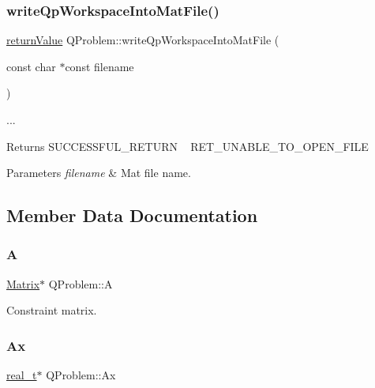 \subsubsection{\texorpdfstring{write\+Qp\+Workspace\+Into\+Mat\+File()}{writeQpWorkspaceIntoMatFile()}}
{\footnotesize\ttfamily \hyperlink{_message_handling_8hpp_a81d556f613bfbabd0b1f9488c0fa865e}{return\+Value} Q\+Problem\+::write\+Qp\+Workspace\+Into\+Mat\+File (\begin{DoxyParamCaption}\item[{const char $\ast$const}]{filename }\end{DoxyParamCaption})}

... \begin{DoxyReturn}{Returns}
S\+U\+C\+C\+E\+S\+S\+F\+U\+L\+\_\+\+R\+E\+T\+U\+RN ~\newline
 R\+E\+T\+\_\+\+U\+N\+A\+B\+L\+E\+\_\+\+T\+O\+\_\+\+O\+P\+E\+N\+\_\+\+F\+I\+LE 
\end{DoxyReturn}

\begin{DoxyParams}{Parameters}
{\em filename} & Mat file name. \\
\hline
\end{DoxyParams}


\subsection{Member Data Documentation}
\mbox{\label{class_q_problem_a3de8a9d6d4204c6907e19f3ceca139f2}} 
\subsubsection{\texorpdfstring{A}{A}}
{\footnotesize\ttfamily \hyperlink{class_matrix}{Matrix}$\ast$ Q\+Problem\+::A\hspace{0.3cm}{\ttfamily [protected]}}

Constraint matrix. \mbox{\label{class_q_problem_a5471677b58b0d513b546e8238c583472}} 
\subsubsection{\texorpdfstring{Ax}{Ax}}
{\footnotesize\ttfamily \hyperlink{qp_o_a_s_e_s__wrapper_8h_a0d00e2b3dfadee81331bbb39068570c4}{real\+\_\+t}$\ast$ Q\+Problem\+::\+Ax\hspace{0.3cm}{\ttfamily [protected]}}

